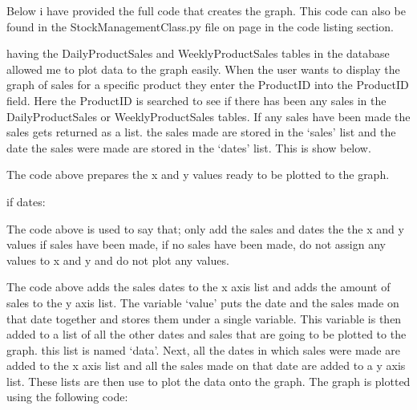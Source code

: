 Below i have provided the full code that creates the graph. This code can also be found in the StockManagementClass.py file on page \pageref{fig:StockManagementClass} in the code listing section.


having the DailyProductSales and WeeklyProductSales tables in the database allowed me to plot data to the graph easily. When the user wants to display the graph of sales for a specific product they enter the ProductID into the ProductID field. Here the ProductID is searched to see if there has been any sales in the DailyProductSales or WeeklyProductSales tables. If any sales have been made the sales gets returned as a list. the sales made are stored in the `sales' list and the date the sales were made are stored in the `dates' list. This is show below.


\pagebreak


The code above prepares the x and y values ready to be plotted to the graph.

\begin{python}
if dates:
\end{python}

The code above is used to say that; only add the sales and dates the the x and y values if sales have been made, if no sales have been made, do not assign any values to x and y and do not plot any values.


The code above adds the sales dates to the x axis list and adds the amount of sales to the y axis list. The variable `value' puts the date and the sales made on that date together and stores them under a single variable. This variable is then added to a list of all the other dates and sales that are going to be plotted to the graph. this list is named `data'. Next, all the dates in which sales were made are added to the x axis list and all the sales made on that date are added to a y axis list. These lists are then use to plot the data onto the graph. The graph is plotted using the following code:


